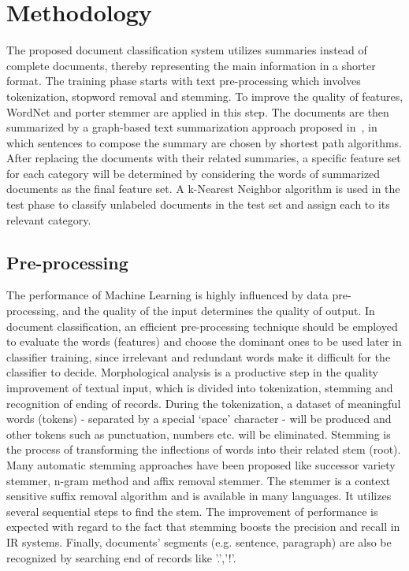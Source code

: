 \documentclass{sigchi}
\begin{document}
\section{Methodology}\label{sectionMethodology}
The proposed document classification system utilizes summaries instead of complete documents, thereby representing the main information in a shorter format.
The training phase starts with text pre-processing which involves tokenization, stopword removal and stemming. 
To improve the quality of features, WordNet and porter stemmer are applied in this step. 
The documents are then summarized by a graph-based text summarization approach proposed in~\cite{sjobergh2006extraction}, in which sentences to compose the summary are chosen by shortest path algorithms. 
After replacing the documents with their related summaries, a specific feature set for each category will be determined by considering the words
of summarized documents as the final feature set. 
A k-Nearest Neighbor algorithm is used in the test phase to classify unlabeled documents in the test set and assign each to its relevant category.

\subsection{Pre-processing}\label{sectionPreprocessing}
The performance of Machine Learning is highly influenced by data pre-processing, and the quality of the input determines the quality of output. 
In document classification, an efficient pre-processing technique should be employed to evaluate the words (features) and choose the dominant ones to be used later in classifier training, since irrelevant and redundant words make it difficult for the classifier to decide.
Morphological analysis is a productive step in the quality improvement of textual input, which is divided into tokenization, stemming and recognition of ending of records. 
During the tokenization, a dataset of meaningful words (tokens) - separated by a special ‘space’ character - will be produced and other tokens such as punctuation, numbers etc. will be eliminated. 
Stemming is the process of transforming the inflections of words into their related stem (root)\cite{Allan:2003:SLM:860435.860548}.
Many automatic stemming approaches have been proposed like successor variety stemmer, n-gram method and affix removal stemmer. 
The stemmer is a context sensitive suffix removal algorithm and is available in many languages. 
It utilizes several sequential steps to find the stem. 
The improvement of performance is expected with regard to the fact that stemming boosts the precision and recall in IR systems.
Finally, documents' segments (e.g. sentence, paragraph) are also be recognized by searching end of records like '.','!'.
\end{document}

